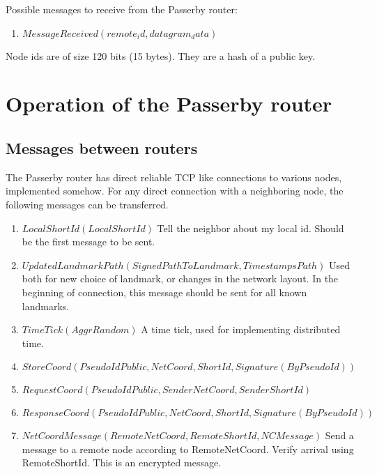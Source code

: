 \documentclass{amsart}
\theoremstyle{definition}
\theoremstyle{remark}
\numberwithin{equation}{section}
\begin{document}
Possible messages to receive from the Passerby router:
\begin{enumerate}
  \item $MessageReceived (remote_id, datagram_data)$
\end{enumerate}

Node ids are of size 120 bits (15 bytes). They are a hash of a public key.

\section{Operation of the Passerby router}

\subsection{Messages between routers}

The Passerby router has direct reliable TCP like connections to various nodes,
implemented somehow. For any direct connection with a neighboring node, the
following messages can be transferred.



\begin{enumerate}
  \item $LocalShortId(LocalShortId)$
      Tell the neighbor about my local id. Should be the first message to be
      sent.
  \item $UpdatedLandmarkPath(SignedPathToLandmark, TimestampsPath)$
      Used both for new choice of landmark, or changes in the network layout.
      In the beginning of connection, this message should be sent for all known
      landmarks. 
  \item $TimeTick(AggrRandom)$
      A time tick, used for implementing distributed time.

  \item $StoreCoord(PseudoIdPublic, NetCoord, ShortId, Signature(By PseudoId))$
  \item $RequestCoord(PseudoIdPublic, SenderNetCoord, SenderShortId)$
  \item $ResponseCoord(PseudoIdPublic, NetCoord, ShortId , Signature(By PseudoId))$ 

  \item $NetCoordMessage(RemoteNetCoord, RemoteShortId, NCMessage)$
    Send a message to a remote node according to RemoteNetCoord. Verify arrival
    using RemoteShortId. This is an encrypted message.
\end{enumerate}
\end{document}
